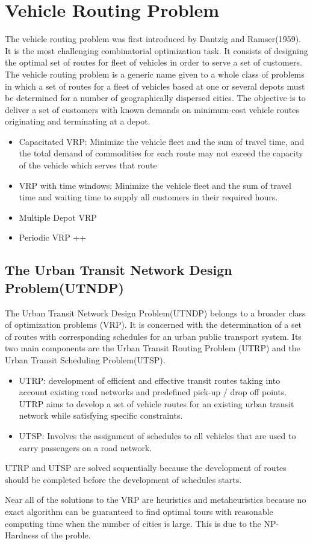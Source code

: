 \section{Vehicle Routing Problem}

The vehicle routing problem was first introduced by Dantzig and Ramser(1959). 
It is the most challenging combinatorial optimization task. It consists of designing the optimal set of routes for fleet of vehicles in order to serve a set of customers. The vehicle routing problem is a generic name given to a whole class of problems in which a set of routes for a fleet of vehicles based at one or several depots must be determined for a number of geographically dispersed cities. The objective is to deliver a set of customers with known demands on minimum-cost vehicle routes originating and terminating at a depot. 

\begin{itemize}
\item Capacitated VRP: Minimize the vehicle fleet and the sum of travel time, and the total demand of commodities for each route may not exceed the capacity of the vehicle which serves that route
\item VRP with time windows: Minimize the vehicle fleet and the sum of travel time and waiting time to supply all customers in their required hours.
\item Multiple Depot VRP
\item Periodic VRP ++ 
\end{itemize}

\subsection{The Urban Transit Network Design Problem(UTNDP)}
The Urban Transit Network Design Problem(UTNDP) belongs to a broader class of optimization problems (VRP). It is concerned with the determination of a set of routes with corresponding schedules for an urban public transport system. 
Its two main components are the Urban Transit Routing Problem (UTRP) and the Urban Transit Scheduling Problem(UTSP).
\begin{itemize}
\item UTRP: development of efficient and effective transit routes taking into account existing road networks and predefined pick-up / drop off points. UTRP aims to develop a set of vehicle routes for an existing urban transit network while satisfying specific constraints. 
\item UTSP: Involves the assignment of schedules to all vehicles that are used to carry passengers on a road network. 
\end{itemize}
UTRP and UTSP are solved sequentially because the development of routes should be completed before the development of schedules starts.


Near all of the solutions to the VRP are heuristics and metaheuristics because no exact algorithm can be guaranteed to find optimal tours with reasonable computing time when the number of cities is large. This is due to the NP-Hardness of the proble.


